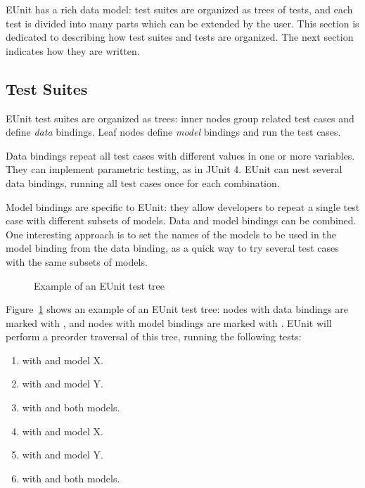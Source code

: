 EUnit has a rich data model: test suites are organized as trees of tests, and each test is divided into many parts which can be extended by the user. This section is dedicated to describing how test suites and tests are organized. The next section indicates how they are written.

\subsection{Test Suites}

EUnit test suites are organized as trees: inner nodes group related test cases and define \emph{data} bindings. Leaf nodes define \emph{model} bindings and run the test cases.

Data bindings repeat all test cases with different values in one or more variables. They can implement parametric testing, as in JUnit 4. EUnit can nest several data bindings, running all test cases once for each combination.

Model bindings are specific to EUnit: they allow developers to repeat a single test case with different subsets of models. Data and model bindings can be combined. One interesting approach is to set the names of the models to be used in the model binding from the data binding, as a quick way to try several test cases with the same subsets of models.

\begin{figure}
  \centering
  
  \caption{Example of an EUnit test tree}
  \label{fig:eunit-test-tree}
\end{figure}

Figure~\ref{fig:eunit-test-tree} shows an example of an EUnit test tree: nodes with data bindings are marked with , and nodes with model bindings are marked with . EUnit will perform a preorder traversal of this tree, running the following tests:
\begin{enumerate}
\item {} with  and model X.
\item {} with  and model Y.
\item {} with  and both models.
\item {} with  and model X.
\item {} with  and model Y.
\item {} with  and both models.
\end{enumerate}

